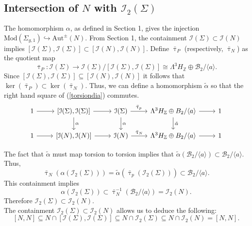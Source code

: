\documentclass[a4paper]{amsproc}
\theoremstyle{TheoremNum}
\theoremstyle{Theorembold}
\theoremstyle{TheoremboldDef}
\theoremstyle{TheoremboldRem}
\theoremstyle{TheoremboldRem}
\begin{document}
\subsection{Intersection of $N$ with ${{\mathcal{I}}_2(\Sigma)}$}\label{Niniapt}
 The homomorphism ${\alpha}$, as defined in Section 1, gives the injection ${\text{Mod}(\Sigma_{g,1})}\hookrightarrow\text{Aut}^\pm(N)$. From Section 1, the containment ${{\mathcal{I}}(\Sigma)}\subset{{\mathcal{I}}(N)}$ implies $[{{\mathcal{I}}(\Sigma)},{{\mathcal{I}}(\Sigma)}]\subset[{{\mathcal{I}}(N)},{{\mathcal{I}}(N)}]$. Define $\bar{\uptau}_P$ (respectively, $\bar{\uptau}_N$) as the quotient map \[\bar{\uptau}_P:{{\mathcal{I}}(\Sigma)}\to {{\mathcal{I}}(\Sigma)}/[{{\mathcal{I}}(\Sigma)},{{\mathcal{I}}(\Sigma)}]\cong\Lambda^3H_{\mathbb{Z}}\oplus\mathcal{B}_2/\langle a\rangle.\]  Since $[{{\mathcal{I}}(\Sigma)},{{\mathcal{I}}(\Sigma)}]\subseteq[{{\mathcal{I}}(N)},{{\mathcal{I}}(N)}]$ it follows that $\ker(\bar{\uptau}_P)\subset\ker(\bar{\uptau}_N)$. Thus, we can define a homomorphism $\tilde{\alpha}$ so that the right hand square of (\ref{torsiondia}) commutes.
  \begin{equation}\label{torsiondia}
   \begin{tikzcd}
 1 \arrow{r}{}  & \left[{{\mathcal{I}}(\Sigma)},{{\mathcal{I}}(\Sigma)}\right] \arrow{d}{\alpha} \arrow{r}{} & {{\mathcal{I}}(\Sigma)}\arrow{r}{\bar{\uptau}_p}\arrow{d}{\alpha} & \Lambda^3H_{\mathbb{Z}}\oplus B_2/\langle a\rangle \arrow{d}{\tilde{\alpha}}\arrow{r} & 1\\
 1 \arrow{r}{}  & \left[{{\mathcal{I}}(N)},{{\mathcal{I}}(N)}\right] \arrow{r}{} & {{\mathcal{I}}(N)}\arrow{r}{\bar{\uptau}_N} & \Lambda^3H_{\mathbb{Z}}\oplus B_2/\langle a\rangle \arrow{r} & 1
 \end{tikzcd}
   \end{equation}

 The fact that $\tilde{\alpha}$ must map torsion to torsion implies that $\tilde{\alpha}(\mathcal{B}_2/\langle a \rangle )\subset\mathcal{B}_2/\langle a \rangle$. Thus,
 \[\bar{\uptau}_N({\alpha}({{\mathcal{I}}_2(\Sigma)}))=\tilde{\alpha}(\bar{\uptau}_p({{\mathcal{I}}_2(\Sigma)}))\subset \mathcal{B}_2/\langle a \rangle.\]
 This containment implies \[{\alpha}({{\mathcal{I}}_2(\Sigma)})\subset \bar{\uptau}_N^{-1}(\mathcal{B}_2/\langle a \rangle )={{\mathcal{I}}_2(N)}.\]
 Therefore ${{\mathcal{I}}_2(\Sigma)}\subset {{\mathcal{I}}_2(N)}$.\\
 
 
The containment ${{\mathcal{I}}_2(\Sigma)}\subset{{\mathcal{I}}_2(N)}$ allows us to deduce the following:
\[[N,N]\subseteq N\cap [{{\mathcal{I}}(\Sigma)},{{\mathcal{I}}(\Sigma)}]\subseteq N\cap{{\mathcal{I}}_2(\Sigma)}\subseteq N\cap {{\mathcal{I}}_2(N)}= [N,N].\] 
\end{document}
